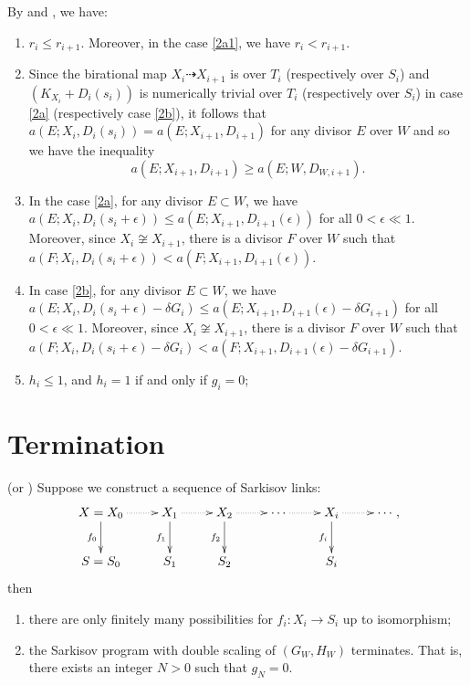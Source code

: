 \begin{assertion}\label{behavior2}
  By \cite[Lemma 13.14-17]{haconMinimalModelProgram2012} and \cite[Lemma 4.2]{liuSarkisovProgramGeneralized2021}, we have:
  \begin{enumerate}
    \item $r_{i}\leqslant r_{i+1}$. Moreover, in the case \ref{2a1}, we have $r_{i}<r_{i+1}$.
    \item Since the birational map $X_{i}\dashrightarrow X_{i+1}$ is over $T_{i}$ (respectively over $S_{i}$) and $(K_{X_{i}}+D_{i}(s_{i}))$ is numerically trivial over $T_{i}$ (respectively over $S_{i}$) in case \ref{2a} (respectively case \ref{2b}), it follows that $a(E;X_{i},D_{i}(s_{i}))= a(E;X_{i+1},D_{i+1})$ for any divisor $E$ over $W$ and so we have the inequality
          \[
            a(E;X_{i+1},D_{i+1})\geqslant a(E;W,D_{W,i+1}).
          \]
    \item\label{2adicrepancy}  In the case \ref{2a}, for any divisor $E \subset W$, we have $a(E;X_{i},D_{i}(s_{i}+\epsilon))\leqslant a(E;X_{i+1},D_{i+1}(\epsilon))$ for all $0<\epsilon\ll 1$. Moreover, since $X_{i} \not\cong X_{i+1}$, there is a divisor $F$ over $W$ such that  $a(F;X_{i},D_{i}(s_{i}+\epsilon))< a(F;X_{i+1},D_{i+1}(\epsilon))$.

    \item\label{2bdiscrepancy}   In case \ref{2b}, for any divisor $E \subset W$, we have $a(E;X_{i},D_{i}(s_{i}+\epsilon)-\delta G_{i})\leqslant a(E;X_{i+1},D_{i+1}(\epsilon)-\delta G_{i+1})$ for all $0<\epsilon\ll 1$. Moreover, since $X_{i} \not\cong X_{i+1}$, there is a divisor $F$ over $W$ such that  $a(F;X_{i},D_{i}(s_{i}+\epsilon)-\delta G_{i})< a(F;X_{i+1},D_{i+1}(\epsilon)-\delta G_{i+1})$.
    \item  $h_{i}\leqslant 1$, and $h_{i}=1$ if and only if $g_{i}=0$;
  \end{enumerate}
\end{assertion}
\section{Termination}
\begin{lemma}\label{termination2}
  \cite[Lemma 13.18-19]{haconMinimalModelProgram2012} (or \cite[Lemma 4.9]{liuSarkisovProgramGeneralized2021}) Suppose we construct a sequence of Sarkisov links:
  \[
    \xymatrix{
    X=X_0\ar@{.>}[r]\ar[d]_{f_0}&X_{1}\ar@{.>}[r]\ar[d]_{f_1}& X_{2}\ar[d]_{f_2}\ar@{.>}[r] &\cdots\ar@{.>}[r]&X_{i}\ar[d]_{f_i}\ar@{.>}[r] &\cdots\\
    S=S_{0}&S_{1} &S_{2}&&S_{i}
    }
    ,\]
  then
  \begin{enumerate}
    \item there are only finitely many possibilities for $f_{i}:X_{i}\to S_{i}$ up to isomorphism;
    \item the Sarkisov program with double scaling of $(G_{W},H_{W})$ terminates. That is, there exists an integer $N>0$ such that $g_{N}=0$.
  \end{enumerate}
\end{lemma}

